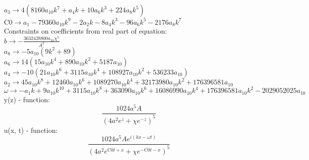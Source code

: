 \documentclass[12pt,a4paper,draft]{article}
\begin{document}
$a_{3}\to 4 \left(8160 a_{10} k^7+a_{4} k+10 a_{6} k^3+224 a_{8} k^5\right)$\\
$\text{C0}\to a_{1}-79360 a_{10} k^9-2 a_{2} k-8 a_{4} k^3-96 a_{6} k^5-2176 a_{8} k^7$\\
Constraints on coefficients from real part of equation:
\\$b\to -\frac{3632428800 a_{10} \chi ^5}{A^2}$\\
$a_{8}\to -5 a_{10} \left(9 k^2+89\right)$\\
$a_{6}\to 14 \left(15 a_{10} k^4+890 a_{10} k^2+5187 a_{10}\right)$\\
$a_{4}\to -10 \left(21 a_{10} k^6+3115 a_{10} k^4+108927 a_{10} k^2+536233 a_{10}\right)$\\
$a_{2}\to 45 a_{10} k^8+12460 a_{10} k^6+1089270 a_{10} k^4+32173980 a_{10} k^2+176396581 a_{10}$\\
$\omega \to -a_{1} k+9 a_{10} k^{10}+3115 a_{10} k^8+363090 a_{10} k^6+16086990 a_{10} k^4+176396581 a_{10} k^2-2029052025 a_{10}$\\


y(z) - function:
$$
\frac{1024 a^5 A}{\left(4 a^2 e^z+\chi  e^{-z}\right)^5}
$$
u(x, t) - function:
$$
\frac{1024 a^5 A e^{i (k x-\omega  t)}}{\left(4 a^2 e^{\text{C0} t+x}+\chi  e^{-\text{C0} t-x}\right)^5}
$$
\end{document}
